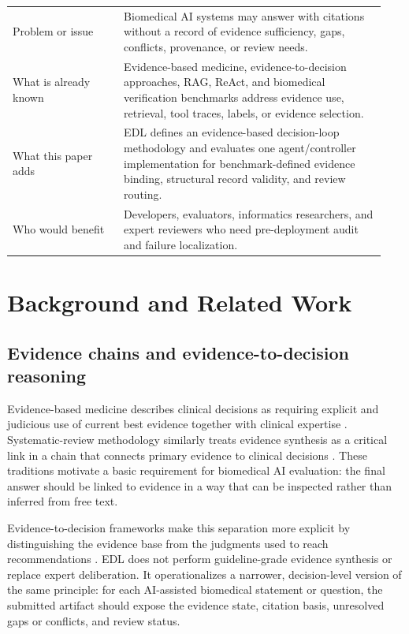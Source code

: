 \documentclass[11pt,a4paper]{article}
\begin{document}
\begin{center}
\small
\begin{tabular}{@{}p{0.28\linewidth}p{0.66\linewidth}@{}}
\toprule
Problem or issue & Biomedical AI systems may answer with citations without a record of evidence sufficiency, gaps, conflicts, provenance, or review needs. \\
What is already known & Evidence-based medicine, evidence-to-decision approaches, RAG, ReAct, and biomedical verification benchmarks address evidence use, retrieval, tool traces, labels, or evidence selection. \\
What this paper adds & EDL defines an evidence-based decision-loop methodology and evaluates one agent/controller implementation for benchmark-defined evidence binding, structural record validity, and review routing. \\
Who would benefit & Developers, evaluators, informatics researchers, and expert reviewers who need pre-deployment audit and failure localization. \\
\bottomrule
\end{tabular}
\end{center}

\section{Background and Related Work}

\subsection{Evidence chains and evidence-to-decision reasoning}

Evidence-based medicine describes clinical decisions as requiring explicit and judicious use of current best evidence together with clinical expertise \cite{sackett1996ebm}. Systematic-review methodology similarly treats evidence synthesis as a critical link in a chain that connects primary evidence to clinical decisions \cite{mulrow1997chain,cook1997synthesis}. These traditions motivate a basic requirement for biomedical AI evaluation: the final answer should be linked to evidence in a way that can be inspected rather than inferred from free text.

Evidence-to-decision frameworks make this separation more explicit by distinguishing the evidence base from the judgments used to reach recommendations \cite{alonso2016etd1,alonso2016etd2}. EDL does not perform guideline-grade evidence synthesis or replace expert deliberation. It operationalizes a narrower, decision-level version of the same principle: for each AI-assisted biomedical statement or question, the submitted artifact should expose the evidence state, citation basis, unresolved gaps or conflicts, and review status.
\end{document}
